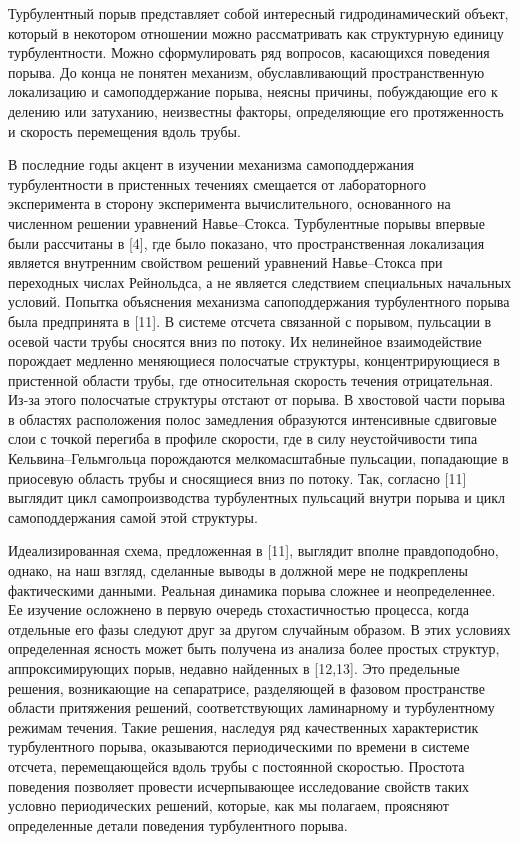 Турбулентный порыв представляет собой интересный гидродинамический объект, который в некотором отношении можно рассматривать как структурную единицу турбулентности. Можно сформулировать ряд вопросов, касающихся поведения порыва. До конца не понятен механизм, обуславливающий пространственную локализацию и самоподдержание порыва, неясны причины, побуждающие его к делению или затуханию, неизвестны факторы, определяющие его протяженность и скорость перемещения вдоль трубы.

В последние годы акцент в изучении механизма самоподдержания турбулентности в пристенных течениях смещается от лабораторного эксперимента в сторону эксперимента вычислительного, основанного на численном решении уравнений Навье--Стокса. Турбулентные порывы впервые были рассчитаны в [4], где было показано, что пространственная локализация является внутренним свойством решений уравнений Навье--Стокса при переходных числах Рейнольдса, а не является следствием специальных начальных условий. Попытка объяснения механизма сапоподдержания турбулентного порыва была предпринята в [11]. В системе отсчета связанной с порывом, пульсации в осевой части трубы сносятся вниз по потоку. Их нелинейное взаимодействие порождает медленно меняющиеся полосчатые структуры, концентрирующиеся в пристенной области трубы, где относительная скорость течения отрицательная. Из-за этого полосчатые структуры отстают от порыва. В хвостовой части порыва в областях расположения полос замедления образуются интенсивные сдвиговые слои с точкой перегиба в профиле скорости, где в силу неустойчивости типа Кельвина--Гельмгольца порождаются мелкомасштабные пульсации, попадающие в приосевую область трубы и сносящиеся вниз по потоку. Так, согласно [11] выглядит цикл самопроизводства турбулентных пульсаций внутри порыва и цикл самоподдержания самой этой структуры.

Идеализированная схема, предложенная в [11], выглядит вполне правдоподобно, однако, на наш взгляд, сделанные выводы в должной мере не подкреплены фактическими данными. Реальная динамика порыва сложнее и неопределеннее. Ее изучение осложнено в первую очередь стохастичностью процесса, когда отдельные его фазы следуют друг за другом случайным образом. В этих условиях определенная ясность может быть получена из анализа более простых структур, аппроксимирующих порыв, недавно найденных в [12,13]. Это предельные решения, возникающие на сепаратрисе, разделяющей в фазовом пространстве области притяжения решений, соответствующих ламинарному и турбулентному режимам течения. Такие решения, наследуя ряд качественных характеристик турбулентного порыва, оказываются периодическими по времени в системе отсчета, перемещающейся вдоль трубы с постоянной скоростью. Простота поведения позволяет провести исчерпывающее исследование свойств таких условно периодических решений, которые, как мы полагаем, проясняют определенные детали поведения турбулентного порыва.

